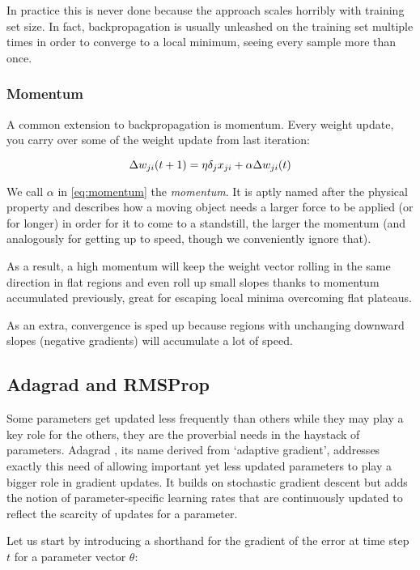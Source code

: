 In practice this is never done because the approach scales horribly
with training set size.
In fact, backpropagation is usually unleashed on the training set multiple times
in order to converge to a local minimum,
seeing every sample more than once.

\subsubsection{Momentum}
A common extension to backpropagation is momentum.
Every weight update,
you carry over some of the weight update from last iteration:

\begin{equation}
  \Delta w_{ji}(t+1) = \eta \delta_j x_{ji} + \\
  \alpha \Delta w_{ji}(t)
  \label{eq:momentum}
\end{equation}

We call $\alpha$ in \ref{eq:momentum} the \textit{momentum}.
It is aptly named after the physical property
and describes how a moving object needs a
larger force to be applied (or for longer)
in order for it to come to a standstill,
the larger the momentum
(and analogously for getting up to speed,
though we conveniently ignore that).

As a result,
a high momentum will keep the weight vector
rolling in the same direction in flat regions
and even roll up small slopes thanks to momentum
accumulated previously,
great for escaping local minima
overcoming flat plateaus.

As an extra,
convergence is sped up
because regions with unchanging downward slopes (negative gradients)
will accumulate a lot of speed.

\subsection{Adagrad and RMSProp}
\label{sub:adagrad_and_rmsprop}
Some parameters get updated less frequently than others
while they may play a key role for the others,
they are the proverbial needs in the haystack of parameters.
Adagrad \parencite{Duchi2011},
its name derived from `adaptive gradient',
addresses exactly this need of allowing important
yet less updated parameters
to play a bigger role in gradient updates.
It builds on stochastic gradient descent
but adds the notion
of parameter-specific learning rates
that are continuously updated to reflect
the scarcity of updates for a parameter.

Let us start by introducing a shorthand for
the gradient of the error at time step $t$
for a parameter vector $\theta$:

